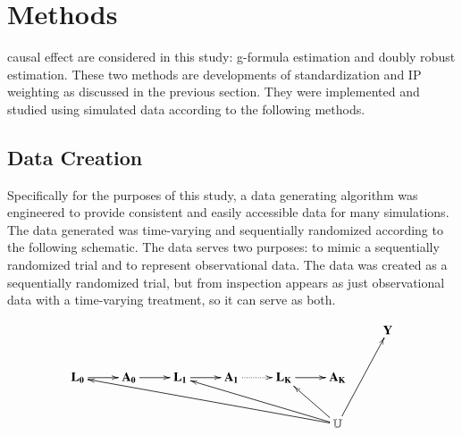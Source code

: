 
\chapter{Methods} \label{Methods}


 causal effect are considered in this study: g-formula estimation and doubly robust estimation.  These two methods are developments of standardization and IP weighting as discussed in the previous section.  They were implemented and studied using simulated data according to the following methods.  

\section{Data Creation} \label{data}
Specifically for the purposes of this study, a data generating algorithm was engineered to provide consistent and easily accessible data for many simulations.  The data generated was time-varying and sequentially randomized according to the following schematic.  The data serves two purposes: to mimic a sequentially randomized trial and to represent observational data.  The data was created as a sequentially randomized trial, but from inspection appears as just observational data with a time-varying treatment, so it can serve as both.  

\begin{figure}[h!]
  \begin{displaymath}
    \xymatrix{
    	& & & & & & \mathbf{Y} \\
        \mathbf{L_0} \ar[r] & \mathbf{A_0} \ar[r]  & \mathbf{ L_1} \ar[r]  & \mathbf{A_1} \ar@{.>}[r] & \mathbf{L_K} \ar[r] & \mathbf{A_K} &  \\ 
        & & & & & \ar[lllllu] \ar[lllu]  \ar[lu] \mathbb{U}  \ar[ruu]  & 
        }
\end{displaymath}
 \end{figure}


